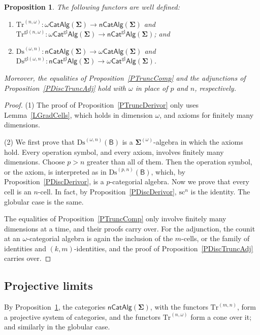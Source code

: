 \documentclass[a4paper,reqno]{amsart}
\newcommand{\sig}[1]{\mathbf{#1}}                %
\newcommand{\calg}[1]{\boldsymbol{\mathsf{#1}}}  %
\newcommand{\gl}{\mathrm{gl}}
\newcommand{\src}{\mathrm{sc}}
\newcommand{\Ds}{\mathrm{Ds}}
\newcommand{\Tr}{\mathrm{Tr}}
\newcommand{\mor}{\to}
\theoremstyle{plain}
\newtheorem{proposition}[theorem]{Proposition}
\theoremstyle{definition}
\begin{document}
\begin{proposition}\label{PTruncOmega}
The following functors are well defined:
\begin{enumerate}
\item $\Tr^{(n,\omega)}\colon\omega\mathsf{CatAlg}(\sig{\Sigma})\mor\mathsf{nCatAlg}(\sig{\Sigma})$ and $\Tr^{\gl(n,\omega)}\colon\omega\mathsf{Cat}^{\gl}\mathsf{Alg}(\sig{\Sigma})\mor\mathsf{nCat}^{\gl}\mathsf{Alg}(\sig{\Sigma})$; and
\item $\Ds^{(\omega,n)}\colon\mathsf{nCatAlg}(\sig{\Sigma})\mor\omega\mathsf{CatAlg}(\sig{\Sigma})$ and $\Ds^{\gl(\omega,n)}\colon\mathsf{nCat}^{\gl}\mathsf{Alg}(\sig{\Sigma})\mor\omega\mathsf{Cat}^{\gl}\mathsf{Alg}(\sig{\Sigma})$.
\end{enumerate}
Moreover, the equalities of Proposition~\ref{PTruncComp} and the adjunctions of Proposition~\ref{PDiscTruncAdj} hold with $\omega$ in place of $p$ and $n$, respectively.
\end{proposition}
\begin{proof}
(1) The proof of Proposition~\ref{PTruncDerivor} only uses Lemma~\ref{LGradCells}, which holds in dimension $\omega$, and axioms for finitely many dimensions.

(2) We first prove that $\Ds^{(\omega,n)}(\calg{B})$ is a $\sig{\Sigma}^{(\omega)}$-algebra in which the axioms hold.
Every operation symbol, and every axiom, involves finitely many dimensions.
Choose $p>n$ greater than all of them.
Then the operation symbol, or the axiom, is interpreted as in $\Ds^{(p,n)}(\calg{B})$, which, by Proposition~\ref{PDiscDerivor}, is a $p$-categorial algebra.
Now we prove that every cell is an $n$-cell.
In fact, by Proposition~\ref{PDiscDerivor}, $\src^{n}$ is the identity.
The globular case is the same.

The equalities of Proposition~\ref{PTruncComp} only involve finitely many dimensions at a time, and their proofs carry over.
For the adjunction, the counit at an $\omega$-categorial algebra is again the inclusion of the $m$-cells, or the family of identities and $(k,m)$-identities, and the proof of Proposition~\ref{PDiscTruncAdj} carries over.
\end{proof}

\subsection{Projective limits}

By Proposition~\ref{PTruncOmega}, the categories $\mathsf{nCatAlg}(\sig{\Sigma})$, with the functors $\Tr^{(m,n)}$, form a projective system of categories, and the functors $\Tr^{(n,\omega)}$ form a cone over it; and similarly in the globular case.
\end{document}
